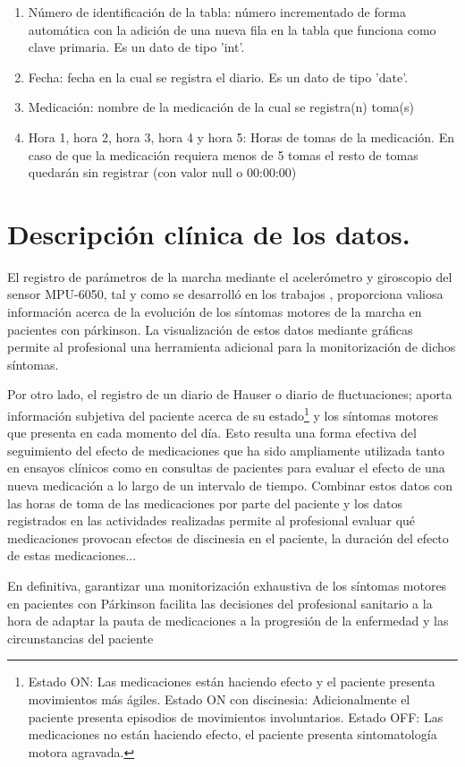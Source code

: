 \begin{itemize}
\begin{enumerate}
        \item Número de identificación de la tabla: número incrementado de forma automática con la adición de una nueva fila en la tabla que funciona como clave primaria. Es un dato de tipo 'int'.
        \item Fecha: fecha en la cual se registra el diario. Es un dato de tipo 'date'.
        \item Medicación: nombre de la medicación de la cual se registra(n) toma(s)
        \item Hora 1, hora 2, hora 3, hora 4 y hora 5: Horas de tomas de la medicación. En caso de que la medicación requiera menos de 5 tomas el resto de tomas quedarán sin registrar (con valor null o 00:00:00)
    \end{enumerate}
\end{itemize}
\section{Descripción clínica de los datos.}
El registro de parámetros de la marcha mediante el acelerómetro y giroscopio del sensor MPU-6050, tal y como se desarrolló en los trabajos \cite{Martos2024} \cite{Gonzalez2023}, proporciona valiosa información acerca de la evolución de los síntomas motores de la marcha en pacientes con párkinson. La visualización de estos datos mediante gráficas permite al profesional una herramienta adicional para la monitorización de dichos síntomas.

Por otro lado, el registro de un diario de Hauser \cite{hauser2000home} o diario de fluctuaciones; aporta información subjetiva del paciente acerca de su estado\footnote{Estado ON: Las medicaciones están haciendo efecto y el paciente presenta movimientos más ágiles. Estado ON con discinesia: Adicionalmente el paciente presenta episodios de movimientos involuntarios. Estado OFF: Las medicaciones no están haciendo efecto, el paciente presenta sintomatología motora agravada.} y los síntomas motores que presenta en cada momento del día. Esto resulta una forma efectiva del seguimiento del efecto de medicaciones que ha sido ampliamente utilizada tanto en ensayos clínicos como en consultas de pacientes para evaluar el efecto de una nueva medicación a lo largo de un intervalo de tiempo. Combinar estos datos con las horas de toma de las medicaciones por parte del paciente y los datos registrados en las actividades realizadas permite al profesional evaluar qué medicaciones provocan efectos de discinesia en el paciente, la duración del efecto de estas medicaciones...

En definitiva, garantizar una monitorización exhaustiva de los síntomas motores en pacientes con Párkinson facilita las decisiones del profesional sanitario a la hora de adaptar la pauta de medicaciones a la progresión de la enfermedad y las circunstancias del paciente
